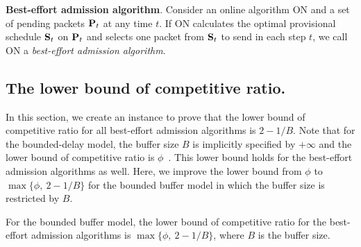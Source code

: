 \documentclass[final, 11pt]{article}
\begin{document}
\begin{Definition}
{\bf Best-effort admission algorithm}. Consider an online algorithm ON and a set of pending packets ${\bf P}_t$ at any time $t$. If ON calculates the optimal provisional schedule ${\bf S}_t$ on ${\bf P}_t$ and selects one packet from ${\bf S}_t$ to send in each step $t$, we call ON a {\em best-effort admission algorithm}.
\end{Definition}



\subsection{The lower bound of competitive ratio.}

In this section, we create an instance to prove that the lower bound of competitive ratio for all best-effort admission algorithms is $2 - 1 / B$. Note that for the bounded-delay model, the buffer size $B$ is implicitly specified by $+\infty$ and the lower bound of competitive ratio is $\phi$~\cite{AMRR05, H01, CF03}. This lower bound holds for the best-effort admission algorithms as well. Here, we improve the lower bound from $\phi$ to $\max\{\phi, \ 2 - 1 / B\}$ for the bounded buffer model in which the buffer size is restricted by $B$.

\begin{theorem}
For the bounded buffer model, the lower bound of competitive ratio for the best-effort admission algorithms is $\max\{\phi, \ 2 - 1 / B\}$, where $B$ is the buffer size.
\label{theorem:lowerbound}
\end{theorem}
\end{document}
